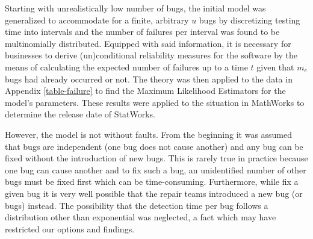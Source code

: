 Starting with unrealistically low number of bugs, the initial model was generalized to accommodate for a finite, arbitrary $u$ bugs by discretizing testing time into intervals and the number of failures per interval was found to be multinomially distributed. Equipped with said information, it is necessary for businesses to derive (un)conditional reliability measures for the software by the means of calculating the expected number of failures up to a time $t$ given that $m_e$ bugs had already occurred or not. The theory was then applied to the data in Appendix \ref{table-failure} to find the Maximum Likelihood Estimators for the model's parameters. These results were applied to the situation in MathWorks to determine the release date of StatWorks.

However, the model is not without faults. From the beginning it was assumed that bugs are independent (one bug does not cause another) and any bug can be fixed without the introduction of new bugs. This is rarely true in practice because one bug can cause another and to fix such a bug, an unidentified number of other bugs must be fixed first which can be time-consuming. Furthermore, while fix a given bug it is very well possible that the repair teams introduced a new bug (or bugs) instead. The possibility that the detection time per bug follows a distribution other than exponential was neglected, a fact which may have restricted our options and findings.